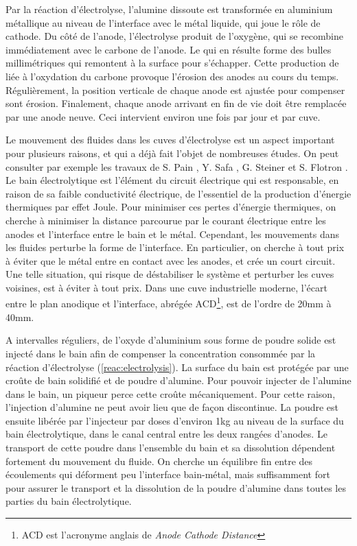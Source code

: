 Par la réaction d'électrolyse, l'alumine dissoute est transformée en
aluminium métallique au niveau de l'interface avec le métal liquide,
qui joue le rôle de cathode. Du côté de l'anode, l'électrolyse produit
de l'oxygène, qui se recombine immédiatement avec le carbone de
l'anode. Le  qui en résulte forme des bulles millimétriques
qui remontent à la surface pour s'échapper. Cette production de
 liée à l'oxydation du carbone provoque l'érosion des anodes
au cours du temps. Régulièrement, la position verticale de chaque
anode est ajustée pour compenser sont érosion. Finalement, chaque
anode arrivant en fin de vie doit être remplacée par une anode
neuve. Ceci intervient environ une fois par jour et par cuve.

Le mouvement des fluides dans les cuves d'électrolyse est un aspect
important pour plusieurs raisons, et qui a déjà fait l'objet de
nombreuses études. On peut consulter par exemple les travaux de
S. Pain \cite{Pain2006}, Y. Safa \cite{Safa2009}, G. Steiner
\cite{Steiner2009} et S. Flotron \cite{Flotron2013}. Le bain
électrolytique est l'élément du circuit électrique qui est
responsable, en raison de sa faible conductivité électrique, de
l'essentiel de la production d'énergie thermiques par effet
Joule. Pour minimiser ces pertes d'énergie thermiques, on cherche à
minimiser la distance parcourue par le courant électrique entre les
anodes et l'interface entre le bain et le métal. Cependant, les
mouvements dans les fluides perturbe la forme de l'interface. En
particulier, on cherche à tout prix à éviter que le métal entre en
contact avec les anodes, et crée un court circuit. Une telle
situation, qui risque de déstabiliser le système et perturber les
cuves voisines, est à éviter à tout prix. Dans une cuve industrielle
moderne, l'écart entre le plan anodique et l'interface, abrégée
ACD\footnote{ACD est l'acronyme anglais de {\em Anode Cathode
    Distance}}, est de l'ordre de \num{20}\si{\milli\meter} à
\num{40}\si{\milli\meter}.

A intervalles réguliers, de l'oxyde d'aluminium sous forme de poudre
solide est injecté dans le bain afin de compenser la concentration
consommée par la réaction d'électrolyse (\ref{reac:electrolysis}).  La
surface du bain est protégée par une croûte de bain solidifié et de
poudre d'alumine. Pour pouvoir injecter de l'alumine dans le bain, un
piqueur perce cette croûte mécaniquement. Pour cette raison,
l'injection d'alumine ne peut avoir lieu que de façon discontinue.  La
poudre est ensuite libérée par l'injecteur par doses d'environ
\num{1}\si{\kilo\gram} au niveau de la surface du bain électrolytique,
dans le canal central entre les deux rangées d'anodes. Le transport de
cette poudre dans l'ensemble du bain et sa dissolution dépendent
fortement du mouvement du fluide. On cherche un équilibre fin entre
des écoulements qui déforment peu l'interface bain-métal, mais
suffisamment fort pour assurer le transport et la dissolution de la
poudre d'alumine dans toutes les parties du bain électrolytique.

